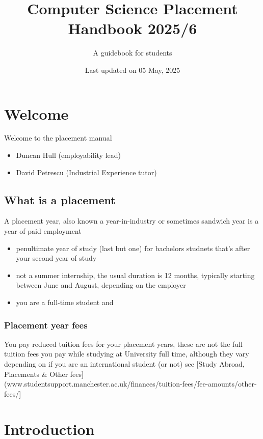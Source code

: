 \documentclass[
]{book}
\title{Computer Science Placement Handbook 2025/6}
\author{A guidebook for students}
\date{Last updated on 05 May, 2025}
\providecommand{\tightlist}{%
  \setlength{\itemsep}{0pt}\setlength{\parskip}{0pt}}
\begin{document}
\maketitle

{
\setcounter{tocdepth}{1}
\tableofcontents
}
\chapter*{Welcome}\label{welcome}

Welcome to the placement manual

\begin{itemize}
\tightlist
\item
  Duncan Hull (employability lead)
\item
  David Petrescu (Industrial Experience tutor)
\end{itemize}

\section{What is a placement}\label{whatisie}

A placement year, also known a year-in-industry or sometimes sandwich year is a year of paid employment

\begin{itemize}
\tightlist
\item
  penultimate year of study (last but one) for bachelors studnets that's after your second year of study
\item
  not a summer internship, the usual duration is 12 months, typically starting between June and August, depending on the employer
\item
  you are a full-time student and
\end{itemize}

\subsection{Placement year fees}\label{fees}

You pay reduced tuition fees for your placement years, these are not the full tuition fees you pay while studying at University full time, although they vary depending on if you are an international student (or not) see {[}Study Abroad, Placements \& Other fees{]}(www.studentsupport.manchester.ac.uk/finances/tuition-fees/fee-amounts/other-fees/{]} \citep{fees}

\chapter{Introduction}\label{intro}
\end{document}
